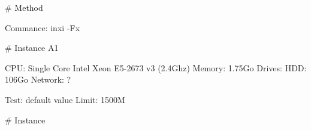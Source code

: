 # Method

Commance: inxi -Fx

# Instance A1

CPU: Single Core Intel Xeon E5-2673 v3 (2.4Ghz)
Memory: 1.75Go
Drives: HDD: 106Go
Network: ?


Test: default value
Limit: 1500M


# Instance 